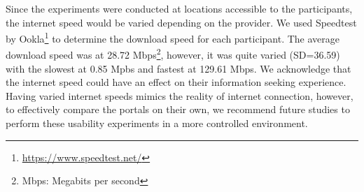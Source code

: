 \documentclass{sigchi}
\begin{document}

Since the experiments were conducted at locations accessible to the participants, the internet speed would be varied depending on the provider. We used Speedtest by Ookla\footnote{\url{https://www.speedtest.net/}} to determine the download speed for each participant. The average download speed was at 28.72 Mbps\footnote{Mbps: Megabits per second}, however, it was quite varied (SD=36.59) with the slowest at 0.85 Mpbs and fastest at 129.61 Mbps. We acknowledge that the internet speed could have an effect on their information seeking experience. Having varied internet speeds mimics the reality of internet connection, however, to effectively compare the portals on their own, we recommend future studies to perform these usability experiments in a more controlled environment.
\end{document}
